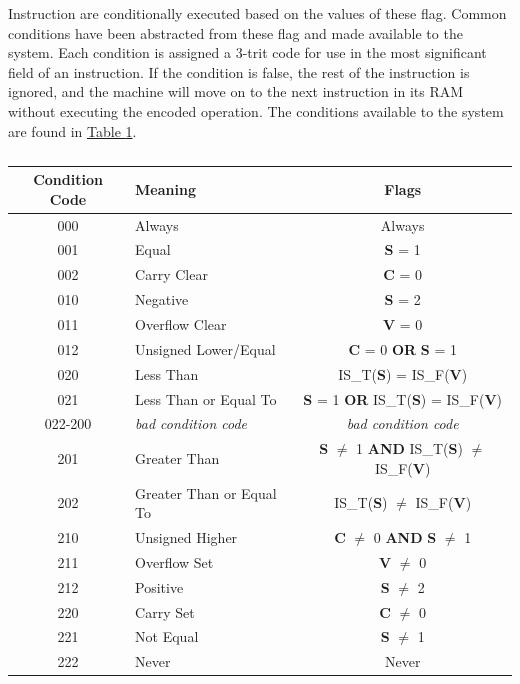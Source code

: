 \documentclass[12pt]{article}
\begin{document}
Instruction are conditionally executed based on the values of these flag. Common conditions have been abstracted from these flag and made available to the system. Each condition is assigned a 3-trit code for use in the most significant field of an instruction. If the condition is false, the rest of the instruction is ignored, and the machine will move on to the next instruction in its RAM without executing the encoded operation. The conditions available to the system are found in \hyperref[tab:Conditions]{Table \ref{tab:Conditions}}.

\begin{table}[h!]
    \centering
    \caption{}
    \label{tab:Conditions}
    \begin{tabular}{|c|l|c|} 
        \hline
        \textbf{Condition Code} & Meaning & Flags \\ \hline
        
        000 & Always & Always \\ \hline
        001 & Equal & \textbf{S} = 1 \\ \hline
        002 & Carry Clear & \textbf{C} = 0 \\ \hline
        010 & Negative & \textbf{S} = 2 \\ \hline
        011 & Overflow Clear & \textbf{V} = 0 \\ \hline
        012 & Unsigned Lower/Equal & \textbf{C} = 0 \textbf{OR} \textbf{S} = 1 \\ \hline
        020 & Less Than & IS\_T(\textbf{S}) = IS\_F(\textbf{V}) \\ \hline
        021 & Less Than or Equal To & \textbf{S} = 1 \textbf{OR} IS\_T(\textbf{S}) = IS\_F(\textbf{V}) \\ \hline
    
        022-200 & \textit{bad condition code} & \textit{bad condition code} \\ \hline
    
        201 & Greater Than & \textbf{S} $\neq$ 1 \textbf{AND} IS\_T(\textbf{S}) $\neq$ IS\_F(\textbf{V}) \\ \hline
        202 & Greater Than or Equal To & IS\_T(\textbf{S}) $\neq$ IS\_F(\textbf{V}) \\ \hline
        210 & Unsigned Higher & \textbf{C} $\neq$ 0 \textbf{AND} \textbf{S} $\neq$ 1 \\ \hline
        211 & Overflow Set & \textbf{V} $\neq$ 0 \\ \hline
        212 & Positive & \textbf{S} $\neq$ 2 \\ \hline
        220 & Carry Set & \textbf{C} $\neq$ 0 \\ \hline
        221 & Not Equal & \textbf{S} $\neq$ 1 \\ \hline
        222 & Never & Never \\ \hline
    \end{tabular}
\end{table}
\end{document}
